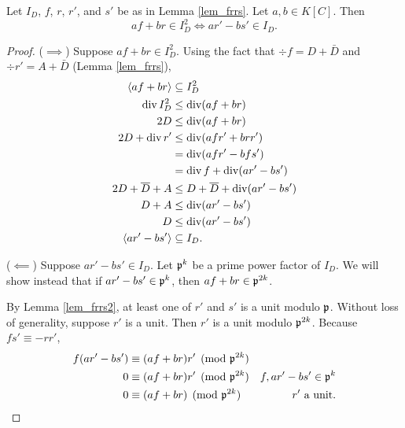 \begin{theorem}
  \label{thm_frrs}
  Let $I_D$, $f$, $r$, $r'$, and $s'$ be as in Lemma \ref{lem_frrs}.
  Let $a, b \in K[C]$. Then
  \[ af + br \in I_D^2 \iff ar' - bs' \in I_D. \]
\end{theorem}
\begin{proof}
  ($\implies$)
  Suppose $af + br \in I_D^2$.
  Using the fact that $\div f = D + \bar D$
  and $\div r' = A + \bar D$ (Lemma \ref{lem_frrs}),
  \begin{align*}
    \left\langle af + br \right\rangle &\subseteq I_D^2 \\
    \operatorname{div} I_D^2 &\leq \operatorname{div}(af + br) \\
    2D &\leq \operatorname{div}(af + br) \\
    2D + \operatorname{div} r' &\leq \operatorname{div}(afr' + brr') \\
      &= \operatorname{div}(afr' - bfs') \\
      &= \operatorname{div} f + \operatorname{div}(ar' - bs') \\
    2D + \overline D + A &\leq D + \overline D + \operatorname{div}(ar' - bs') \\
    D + A &\leq \operatorname{div}(ar' - bs') \\
    D &\leq \operatorname{div}(ar' - bs') \\
    \left\langle ar' - bs' \right\rangle &\subseteq I_D.
  \end{align*}
  
  ($\impliedby$)
  Suppose $ar' - bs' \in I_D$.
  Let $\frak p^k$ be a prime power factor of $I_D$.
  We will show instead that if $ar' - bs' \in \frak p^k$, then $af + br \in \frak p^{2k}$.
  
  By Lemma \ref{lem_frrs2}, at least one of $r'$ and $s'$ is a unit modulo $\frak p$.
  Without loss of generality, suppose $r'$ is a unit.
  Then $r'$ is a unit modulo $\frak p^{2k}$.
  Because $fs' \equiv -rr'$,
  \begin{align*}
    f(ar' - bs') &\equiv (af + br)r' \pmod{\frak p^{2k}} \\
    0 &\equiv (af + br)r' \pmod{\frak p^{2k}}
      & f, ar' - bs' \in \frak p^k \\
    0 &\equiv (af + br) \pmod{\frak p^{2k}}
      & \text{$r'$ a unit}.
  \end{align*}
\end{proof}


